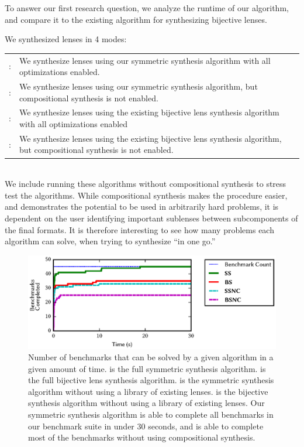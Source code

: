 \documentclass[acmsmall,screen,anonymous]{acmart}
\begin{document}
To answer our first research question, we analyze the runtime of our algorithm,
and compare it to the existing algorithm for synthesizing bijective lenses.

We synthesized lenses in 4 modes:

\begin{tabulary}{\linewidth}{rL}
  \SSOpt{}: & We synthesize lenses using our symmetric synthesis algorithm with all optimizations enabled.\\
  \SSNCOpt{}: & We synthesize lenses using our symmetric synthesis algorithm,
                but compositional synthesis is not enabled.\\
  \BSOpt{}: &  We synthesize lenses using the existing bijective lens synthesis
              algorithm with all optimizations enabled\\
  \BSNCOpt{}: & We synthesize lenses using the existing bijective lens synthesis
                algorithm, but compositional synthesis is not enabled.\\
\end{tabulary}\\

We include running these algorithms without compositional synthesis to stress
test the algorithms. While compositional synthesis makes the procedure easier,
and demonstrates the potential to be used in arbitrarily hard problems, it is
dependent on the user identifying important sublenses between subcomponents of
the final formats. It is therefore interesting to see how many problems each
algorithm can solve, when trying to synthesize ``in one go.''

\begin{figure}
  \includegraphics{generated-graphs/times}
  \caption{ Number of benchmarks that can be solved by a given algorithm in a
    given amount of time. \SSOpt{} is the full symmetric synthesis algorithm.
    \BSOpt{} is the full bijective lens synthesis algorithm. \SSNCOpt{} is the
    symmetric synthesis algorithm without using a library of existing lenses.
    \BSNCOpt{} is the bijective synthesis algorithm without using a library of
    existing lenses. Our symmetric synthesis algorithm is able to complete all
    benchmarks in our benchmark suite in under 30 seconds, and is able to
    complete most of the benchmarks without using compositional synthesis. }
  \label{fig:times}
\end{figure}
\end{document}

